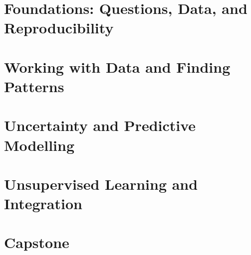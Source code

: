 \documentclass[11pt,oneside,a4paper]{report}
\begin{document}
\utpfrontmatter



\part{Foundations: Questions, Data, and Reproducibility}






\part{Working with Data and Finding Patterns}









\part{Uncertainty and Predictive Modelling}












\part{Unsupervised Learning and Integration}



\part{Capstone}

\end{document}
